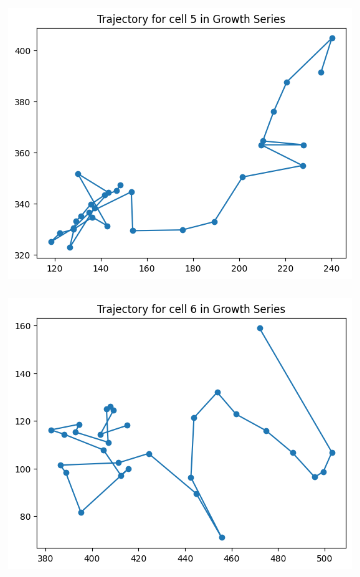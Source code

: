 \documentclass{article}
\begin{document}
\clearpage
\begin{figure}[h!]
    \centering
    \begin{subfigure}[b]{0.5\linewidth}
        \centering
        \includegraphics[width=\linewidth]{Report/Appendix_Images/Trajectory-B-Growth/trajectory_5.png}       
    \end{subfigure}%
    \begin{subfigure}[b]{0.5\linewidth}
        \centering
        \includegraphics[width=\linewidth]{Report/Appendix_Images/Trajectory-B-Growth/trajectory_6.png}
    \end{subfigure}
    \begin{subfigure}[b]{0.5\linewidth}

\end{subfigure}
\end{figure}
\end{document}
